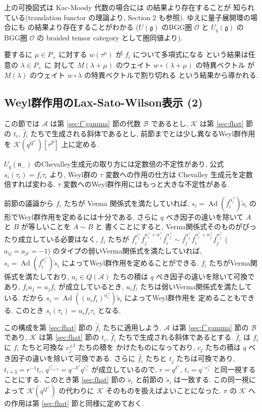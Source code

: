 \documentclass[12pt,twoside,dvipdfm]{msjproc}
\theoremstyle{definition} %
\theoremstyle{definition} %
\theoremstyle{definition} %
\numberwithin{theorem}{section}
\numberwithin{equation}{section}
\numberwithin{figure}{section}
\numberwithin{table}{section}
\newcommand\secref[1]{第 \ref{#1} 節}
\newcommand\g{\mathfrak{g}}
\newcommand\nil{\mathfrak{n}}
\newcommand\A{\mathcal{A}}
\newcommand\K{\mathcal{K}}
\newcommand\B{\mathcal{B}}
\newcommand\Ad{\mathop{\mathrm{Ad}}\nolimits}
\newcommand\ts{{\tilde{s}}}
\newcommand\hf{{\hat{f}}}
\newcommand\ev{\varepsilon^\vee}
\newcommand\av{\alpha^\vee}
\newcommand\dv{\delta^\vee}
\newcommand\Qv{{Q^\vee}}
\newcommand\cO{{\mathcal{O}}}
\begin{document}
上の可換図式は Kac-Moody 代数の場合には \cite{DGK} の結果より存在することが
知られている(translation functor の理論より, \cite{KW} Section 2 も参照).
ゆえに量子展開環の場合にも \cite{EK-VI} の結果より存在することがわかる
($U(\g)$ のBGG圏 $\cO$ と $U_q(\g)$ のBGG圏 $\cO$ 
の braided tensor category として圏同値より).

要するに $\mu\in P_+$ に対する $w(\tau^\mu)$ が $f_i$ について多項式になる
という結果は任意の $\lambda\in P_+$ に
対して $M(\lambda+\mu)$ のウェイト $w\circ(\lambda+\mu)$ の特異ベクトル
が $M(\lambda)$ のウェイト $w\circ\lambda$ の特異ベクトルで割り切れる
という結果から導かれる.



\subsection{Weyl群作用のLax-Sato-Wilson表示 (2)}
\label{sec:Sato-Wilson-2}

この節では $\A$ は\secref{sec:f^gamma}の代数 $\B$ であるとし, 
$\K$ は\secref{sec:fhat}の $t_i$, $\hf_i$ たちで生成される斜体であるとし, 
前節までとは少し異なるWeyl群作用を $\K(q^\Qv)[\tau^P]$ 上に定める.

$U_q(\nil_-)$ のChevalley生成元の取り方には定数倍の不定性があり, 
公式 $s_i(\tau_i)=f_i\tau_i$ より, 
Weyl群の $\tau$ 変数への作用の仕方は Chevalley 生成元を定数倍すれば変わる.
$\tau$ 変数へのWeyl群作用にはもっと大きな不定性がある.

前節の議論から $f_i$ たちが Verma 関係式を満たしていれば, 
$s_i=\Ad(f_i^{\av_i})\ts_i$ の形でWeyl群作用を定めるには十分である.
さらに $q$ べき因子の違いを除いて $A$ と $B$ が等しいことを $A\sim B$ と
書くことにすると, Verma関係式そのものがぴったり成立している必要はなく, 
$f_i$ たちが \(
      f_i^{\av_i} f_j^{\av_i+\av_j} f_i^{\av_j}
 \sim f_j^{\av_j} f_i^{\av_i+\av_j} f_j^{\av_j}
\) ($a_{ij}=a_{ji}=-1$) のタイプの弱いVerma関係式を満たしていれば, 
$s_i=\Ad(f_i^{\av_i})\ts_i$ によってWeyl群作用を定めることができる.
$f_i$ たちがVerma関係式を満たしており, 
$u_i\in Q(\A)$ たちの積は $q$ べき因子の違いを除いて可換であり, 
$f_iu_j=u_jf_i$ が成立しているとき, 
$u_if_i$ たちは弱いVerma関係式を満たしている.
だから $s_i=\Ad((u_if_i)^{\av_i})\ts_i$ によってWeyl群作用を
定めることもできる. このとき $s_i(\tau_i)=u_if_i\tau_i$ となる.

この構成を\secref{sec:fhat}の $\hf_i$ たちに適用しよう.
$\A$ は\secref{sec:f^gamma}の $\B$ であり, 
$\K$ は\secref{sec:fhat}の $t_i$, $\hf_i$ たちで生成される斜体であるとする.
$\hf_i$ は $f_i$ に $f_i$ たちと可換な $c_j^{\pm1}$ たちの積を
かけたものになっており, $c_j$ たちの積は $q$ べき因子の違いを除いて可換である.
さらに $\hf_i$ たちと $t_j$ たちは可換であり, $t_{i+3}=r^{-1}t_i$, 
$q^{\ev_{i+3}}=q^{-\dv}q^{\ev_i}$ が成立しているので, 
$r=q^{\dv}$, $t_i=q^{-\ev_i}$ と同一視することにする.
このとき\secref{sec:fhat}の $\ts_i$ と前節の $\ts_i$ は一致する.
この同一視によって $\K(q^\Qv)$ の代わりに $\K$ そのものを扱えばよいことになった.
$\pi$ の $\K$ への作用は\secref{sec:fhat}と同様に定めておく.
\end{document}
